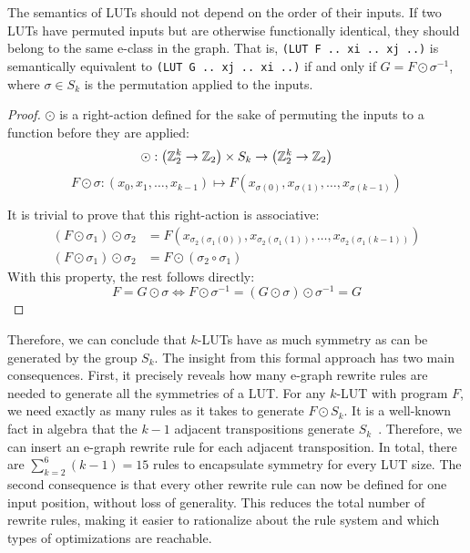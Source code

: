 The semantics of LUTs should not depend on the order of their inputs. If two
LUTs have permuted inputs but are otherwise functionally identical, they should
belong to the same e-class in the graph. That is, \mbox{\texttt{(LUT F .. xi ..
        xj ..)}} is semantically equivalent to \mbox{\texttt{(LUT G .. xj .. xi ..)}}
if and only if $G = F \odot \sigma^{-1}$, where $\sigma \in S_k$ is the
permutation applied to the inputs.

\begin{proof}
    $\odot$ is a right-action defined for the sake of permuting the inputs to a function before they are applied:
    \begin{equation*} \odot : \big (\mathbb{Z}_{2}^{k} \rightarrow \mathbb{Z}_2 \big ) \times S_k \rightarrow \big (\mathbb{Z}_{2}^{k} \rightarrow \mathbb{Z}_2 \big ) \end{equation*}
    \begin{equation*} F \odot \sigma : (x_0, x_1, \ldots, x_{k-1}) \mapsto F(x_{\sigma(0)}, x_{\sigma(1)}, \ldots, x_{\sigma(k-1)}) \end{equation*}

    It is trivial to prove that this right-action is associative:
    \begin{align*}
        (F \odot \sigma_1) \odot \sigma_2 & = F(x_{\sigma_2(\sigma_1(0))}, x_{\sigma_2(\sigma_1(1))}, \ldots, x_{\sigma_2(\sigma_1(k-1))}) \\
        (F \odot \sigma_1) \odot \sigma_2 & = F \odot (\sigma_2 \circ \sigma_1)
    \end{align*}
    With this property, the rest follows directly:
    \begin{equation}
        F = G \odot
        \sigma \iff F \odot \sigma^{-1} = (G \odot \sigma) \odot \sigma^{-1} = G
    \end{equation}
\end{proof}

Therefore, we can conclude that $k$-LUTs have as much symmetry as can be
generated by the group $S_k$. The insight from this formal approach has two
main consequences. First, it precisely reveals how many e-graph rewrite rules
are needed to generate all the symmetries of a LUT. For any $k$-LUT with
program $F$, we need exactly as many rules as it takes to generate $F \odot
    S_k$. It is a well-known fact in algebra that the $k-1$ adjacent transpositions
generate $S_k$~\cite{sgroup}. Therefore, we can insert an e-graph rewrite rule
for each adjacent transposition. In total, there are $\sum_{k=2}^{6} (k-1) =
    15$ rules to encapsulate symmetry for every LUT size. The second consequence is
that every other rewrite rule can now be defined for one input position,
without loss of generality. This reduces the total number of rewrite rules,
making it easier to rationalize about the rule system and which types of
optimizations are reachable.

